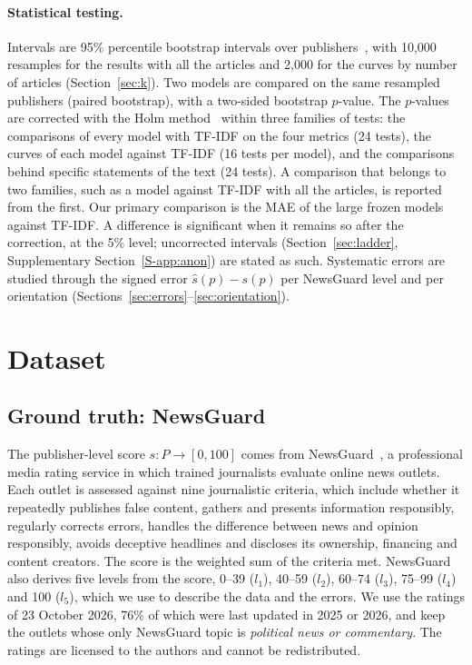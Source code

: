 \documentclass[11pt,a4paper]{article}
\begin{document}
\paragraph{Statistical testing.} Intervals are 95\% percentile bootstrap intervals over
publishers~\cite{efron1979bootstrap}, with 10,000 resamples for the results with all the articles and 2,000 for the
curves by number of articles (Section~\ref{sec:k}). Two models are compared on the same resampled publishers (paired
bootstrap), with a two-sided bootstrap $p$-value. The $p$-values are corrected with the Holm
method~\cite{holm1979simple} within three families of tests: the comparisons of every model with TF-IDF on the four
metrics (24 tests), the curves of each model against TF-IDF (16 tests per model), and the comparisons behind specific
statements of the text (24 tests). A comparison that belongs to two families, such as a model against TF-IDF with all
the articles, is reported from the first. Our primary comparison is the MAE of the large frozen models against TF-IDF. A difference is significant when it
remains so after the correction, at the 5\% level; uncorrected intervals (Section~\ref{sec:ladder}, Supplementary
Section~\ref{S-app:anon}) are stated as such. Systematic errors are studied through the signed error $\hat{s}(p) - s(p)$ per NewsGuard level and per orientation
(Sections~\ref{sec:errors}--\ref{sec:orientation}).

\section{Dataset}\label{sec:data}

\subsection{Ground truth: NewsGuard}\label{sec:labels}
The publisher-level score $s: P \rightarrow [0, 100]$ comes from NewsGuard~\cite{newsguard}, a professional media rating
service in which trained journalists evaluate online news outlets. Each outlet is assessed against nine journalistic
criteria, which include whether it repeatedly publishes false content, gathers and presents information responsibly,
regularly corrects errors, handles the difference between news and opinion responsibly, avoids deceptive headlines and
discloses its ownership, financing and content creators. The score is the weighted sum of the criteria met. NewsGuard
also derives five levels from the score, 0--39 ($l_1$), 40--59 ($l_2$), 60--74 ($l_3$), 75--99 ($l_4$) and 100 ($l_5$),
which we use to describe the data and the errors. We use the ratings of 23 October 2026, 76\% of which were last updated
in 2025 or 2026, and keep the outlets whose only NewsGuard topic is \emph{political news or commentary}. The ratings are
licensed to the authors and cannot be redistributed.
\end{document}
